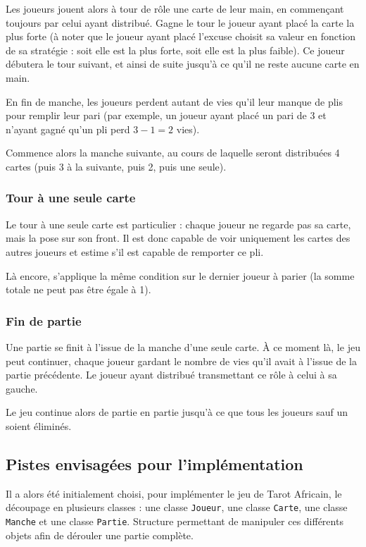          Les joueurs jouent alors à tour de rôle une carte de leur main, en commençant toujours par celui ayant distribué.
         Gagne le tour le joueur ayant placé la carte la plus forte (à noter que le joueur ayant placé l'excuse choisit sa valeur en fonction de sa stratégie : soit elle est la plus forte, soit elle est la plus faible).
         Ce joueur débutera le tour suivant, et ainsi de suite jusqu'à ce qu'il ne reste aucune carte en main.

         En fin de manche, les joueurs perdent autant de vies qu'il leur manque de plis pour remplir leur pari (par exemple, un joueur ayant placé un pari de 3 et n'ayant gagné qu'un pli perd $3-1 = 2$ vies).

         Commence alors la manche suivante, au cours de laquelle seront distribuées 4 cartes (puis 3 à la suivante, puis 2, puis une seule).
      \subsubsection{Tour à une seule carte}
         Le tour à une seule carte est particulier : chaque joueur ne regarde pas sa carte, mais la pose sur son front.
         Il est donc capable de voir uniquement les cartes des autres joueurs et estime s'il est capable de remporter ce pli.

         Là encore, s'applique la même condition sur le dernier joueur à parier (la somme totale ne peut pas être égale à 1).

      \subsubsection{Fin de partie}
         Une partie se finit à l'issue de la manche d'une seule carte.
         À ce moment là, le jeu peut continuer, chaque joueur gardant le nombre de vies qu'il avait à l'issue de la partie précédente.
         Le joueur ayant distribué transmettant ce rôle à celui à sa gauche.

         Le jeu continue alors de partie en partie jusqu'à ce que tous les joueurs sauf un soient éliminés.

   \subsection{Pistes envisagées pour l'implémentation}\label{subsec:pistes-envisagées-pour-l'implémentation}
      Il a alors été initialement choisi, pour implémenter le jeu de Tarot Africain, le découpage en plusieurs classes : une classe \texttt{Joueur}, une classe \texttt{Carte}, une classe \texttt{Manche} et une classe \texttt{Partie}.
      Structure permettant de manipuler ces différents objets afin de dérouler une partie complète.

